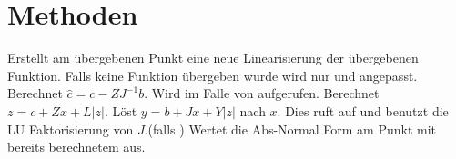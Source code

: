 \section[Private Methoden]{\texorpdfstring{}{Private} Methoden}
\begin{description}
 Erstellt am übergebenen Punkt eine neue Linearisierung der übergebenen Funktion. Falls keine Funktion übergeben wurde wird nur  und  angepasst.
 Berechnet $\hat c = c - Z J^{-1}b$. Wird im Falle von  aufgerufen.
 Berechnet $z = c + Zx + L|z|$.
 Löst $y = b + Jx + Y|z|$ nach $x$. Dies ruft  auf und benutzt die LU Faktorisierung von $J$.(falls  ) 
 Wertet die Abs-Normal Form am Punkt  mit bereits berechnetem  aus. 
\end{description}